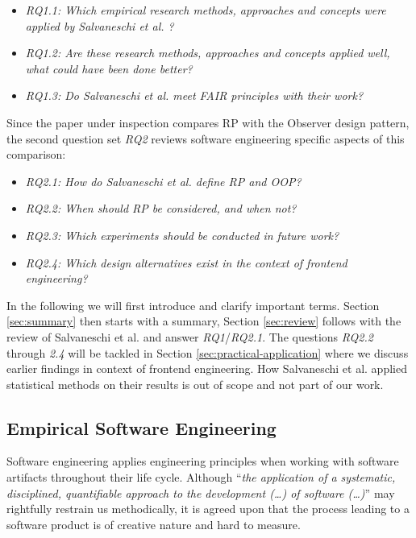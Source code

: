 \documentclass[12pt,a4paper]{article}
\begin{document}
\begin{itemize}
	\item \emph{RQ1.1: Which empirical research methods, approaches and concepts were applied by Salvaneschi et al. \cite{7827078}?}
	\item \emph{RQ1.2: Are these research methods, approaches and concepts applied well, what could have been done better?}
	\item \emph{RQ1.3: Do Salvaneschi et al. \cite{7827078} meet FAIR principles \cite{2019arXiv190805986H} \cite{wilkinson:2016} with their work?}
\end{itemize}

Since the paper under inspection compares RP with the Observer design pattern, the second question set \emph{RQ2} reviews software engineering specific aspects of this comparison:

\begin{itemize}
	\item \emph{RQ2.1: How do Salvaneschi et al. \cite{7827078} define RP and OOP?}
	\item \emph{RQ2.2: When should RP be considered, and when not?}
	\item \emph{RQ2.3: Which experiments should be conducted in future work?}
	\item \emph{RQ2.4: Which design alternatives exist in the context of frontend engineering?}
\end{itemize}

In the following we will first introduce and clarify important terms. Section \ref{sec:summary} then starts with a summary, Section \ref{sec:review} follows with the review of Salvaneschi et al. \cite{7827078} and answer \emph{RQ1}/\emph{RQ2.1}. The questions \emph{RQ2.2} through \emph{2.4} will be tackled in Section \ref{sec:practical-application} where we discuss earlier findings in context of frontend engineering. How Salvaneschi et al. applied statistical methods on their results is out of scope and not part of our work.

\subsection{Empirical Software Engineering}

Software engineering applies engineering principles when working with software artifacts \cite{159342} throughout their life cycle. Although ``\emph{the application of a systematic, disciplined, quantifiable approach to the development (\dots) of software (\dots)}'' \cite{159342} may rightfully restrain us methodically, it is agreed upon that the process leading to a software product is of creative nature \cite{8051350} and hard to measure.
\end{document}
